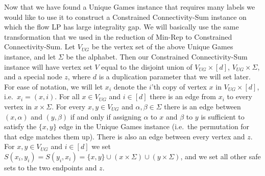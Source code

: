 \documentclass[11pt,letterpaper]{article}
\theoremstyle{definition}
\newcounter{note}[section]
\begin{document}
  Now that we have found a Unique Games instance that requires many
  labels we would like to use it to construct a {\sc Constrained
  Connectivity-Sum} instance on which the flow LP has large integrality
  gap.  We will basically use the same transformation that we used in
  the reduction of {\sc Min-Rep} to {\sc Constrained Connectivity-Sum}.  Let
  $V_{UG}$ be the vertex set of the above Unique Games instance, and
  let $\Sigma$ be the alphabet.  Then our {\sc Constrained Connectivity-Sum}
  instance will have vertex set $V$ equal to the disjoint union of
  $V_{UG} \times [d]$, $V_{UG} \times \Sigma$, and a special node $z$,
  where $d$ is a duplication parameter that we will set later.  For
  ease of notation, we will let $x_i$ denote the $i$'th copy of vertex
  $x$ in $V_{UG} \times [d]$, i.e.\ $x_i = (x,i)$.  For all $x \in
  V_{UG}$ and $i \in [d]$ there is an edge from $x_i$ to every vertex
  in $x \times \Sigma$.  For every $x,y \in V_{UG}$ and $\alpha, \beta
  \in \Sigma$ there is an edge between $(x, \alpha)$ and $(y, \beta)$
  if and only if assigning $\alpha$ to $x$ and $\beta$ to $y$ is
  sufficient to satisfy the $\{x,y\}$ edge in the Unique Games
  instance (i.e.\ the permutation for that edge matches them up).
  There is also an edge between every vertex and $z$.  For $x,y \in
  V_{UG}$ and $i \in [d]$ we set $S(x_i, y_i) = S(y_i, x_i) = \{x,y\}
  \cup (x \times \Sigma) \cup (y \times \Sigma)$, and we set all other
  safe sets to the two endpoints and $z$.
\end{document}
